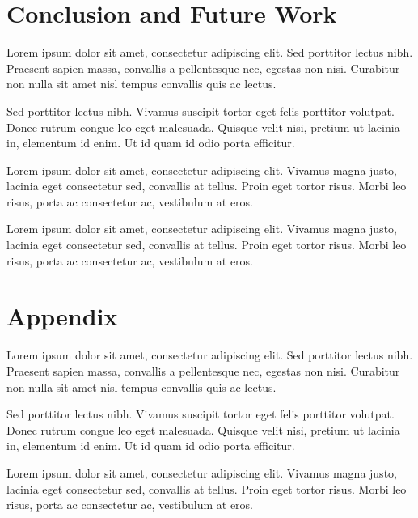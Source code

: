 \documentclass[12pt,twocolumn]{article}
\begin{document}
\section{Conclusion and Future Work}

Lorem ipsum dolor sit amet, consectetur adipiscing elit. Sed porttitor lectus nibh. Praesent sapien massa, convallis a pellentesque nec, egestas non nisi. Curabitur non nulla sit amet nisl tempus convallis quis ac lectus.

Sed porttitor lectus nibh. Vivamus suscipit tortor eget felis porttitor volutpat. Donec rutrum congue leo eget malesuada. Quisque velit nisi, pretium ut lacinia in, elementum id enim. Ut id quam id odio porta efficitur.

Lorem ipsum dolor sit amet, consectetur adipiscing elit. Vivamus magna justo, lacinia eget consectetur sed, convallis at tellus. Proin eget tortor risus. Morbi leo risus, porta ac consectetur ac, vestibulum at eros.

Lorem ipsum dolor sit amet, consectetur adipiscing elit. Vivamus magna justo, lacinia eget consectetur sed, convallis at tellus. Proin eget tortor risus. Morbi leo risus, porta ac consectetur ac, vestibulum at eros.

\clearpage

\onecolumn



\twocolumn
\section{Appendix}

Lorem ipsum dolor sit amet, consectetur adipiscing elit. Sed porttitor lectus nibh. Praesent sapien massa, convallis a pellentesque nec, egestas non nisi. Curabitur non nulla sit amet nisl tempus convallis quis ac lectus.

Sed porttitor lectus nibh. Vivamus suscipit tortor eget felis porttitor volutpat. Donec rutrum congue leo eget malesuada. Quisque velit nisi, pretium ut lacinia in, elementum id enim. Ut id quam id odio porta efficitur.

Lorem ipsum dolor sit amet, consectetur adipiscing elit. Vivamus magna justo, lacinia eget consectetur sed, convallis at tellus. Proin eget tortor risus. Morbi leo risus, porta ac consectetur ac, vestibulum at eros.
\end{document}
